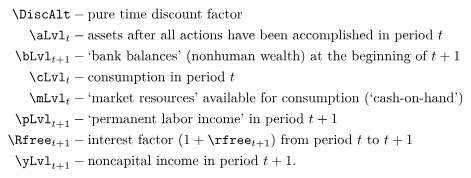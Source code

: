   \begin{equation*}\begin{gathered}\begin{aligned}
        {\DiscAlt}  & - \text{pure time discount factor} \\
        \aLvl_{t}  & - \text{assets after all actions have been accomplished in period $t$} \\
        \bLvl_{t+1}  & - \text{`bank balances' (nonhuman wealth) at the beginning of $t+1$} \\
        \cLvl_{t}  & - \text{consumption in period $t$} \\
        \mLvl_{t}  & - \text{`market resources' available for consumption (`cash-on-hand')} \\
        \pLvl_{t+1}  & - \text{`permanent labor income' in period $t+1$} \\
        \Rfree_{t+1}  & - \text{interest factor $(1+\rfree_{t+1})$ from period $t$ to $t+1$ } \\
        \yLvl_{t+1}  & - \text{noncapital income in period $t+1$}.
      \end{aligned}\end{gathered}\end{equation*}
